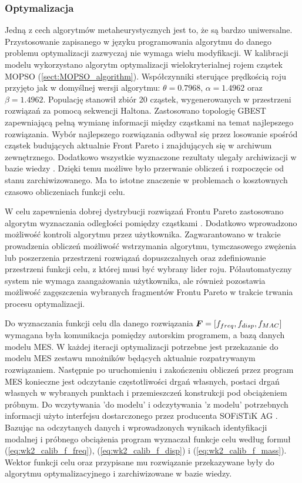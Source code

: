 \subsubsection{Optymalizacja}
Jedną z cech algorytmów metaheurystycznych jest to, że są bardzo uniwersalne. Przystosowanie zapisanego w języku programowania algorytmu do danego problemu optymalizacji zazwyczaj nie wymaga wielu modyfikacji. W kalibracji modelu wykorzystano algorytm optymalizacji wielokryterialnej rojem cząstek MOPSO (\ref{sect:MOPSO_algorithm}). Współczynniki sterujące prędkością roju przyjęto jak w domyślnej wersji algorytmu: $\theta=0.7968$, $\alpha=1.4962$ oraz $\beta=1.4962$. Populację stanowił zbiór 20 cząstek, wygenerowanych w przestrzeni rozwiązań za pomocą sekwencji Haltona. Zastosowano topologię GBEST zapewniającą pełną wymianę informacji między cząstkami na temat najlepszego rozwiązania. Wybór najlepszego rozwiązania odbywał się przez losowanie spośród cząstek budujących aktualnie Front Pareto i znajdujących się w archiwum zewnętrznego. Dodatkowo wszystkie wyznaczone rezultaty ulegały archiwizacji w bazie wiedzy . Dzięki temu możliwe było przerwanie obliczeń i rozpoczęcie od stanu zarchiwizowanego. Ma to istotne znaczenie w problemach o kosztownych czasowo obliczeniach funkcji celu. 

W celu zapewnienia dobrej dystrybucji rozwiązań Frontu Pareto zastosowano algorytm wyznaczania odległości pomiędzy cząstkami \parencite{Deb2002}. Dodatkowo wprowadzono możliwość kontroli algorytmu przez użytkownika. Zagwarantowano w trakcie prowadzenia obliczeń możliwość wstrzymania algorytmu, tymczasowego zwężenia lub poszerzenia przestrzeni rozwiązań dopuszczalnych oraz zdefiniowanie przestrzeni funkcji celu, z której musi być wybrany lider roju. Półautomatyczny system nie wymaga zaangażowania użytkownika, ale również pozostawia możliwość zagęszczenia wybranych fragmentów Frontu Pareto w trakcie trwania procesu optymalizacji.

Do wyznaczania funkcji celu dla danego rozwiązania $\bm{F}=[f_{freq},f_{disp},f_{MAC}]$ wymagana była komunikacja pomiędzy autorskim programem, a bazą danych modelu MES. W każdej iteracji optymalizacji potrzebne jest przekazanie do modelu MES zestawu mnożników będących aktualnie rozpatrywanym rozwiązaniem. Następnie po uruchomieniu i zakończeniu obliczeń przez program MES konieczne jest odczytanie częstotliwości drgań własnych, postaci drgań własnych w wybranych punktach i przemieszczeń konstrukcji pod obciążeniem próbnym. Do wczytywania 'do modelu' i odczytywania 'z modelu' potrzebnych informacji użyto interfejsu dostarczonego przez producenta SOFiSTiK AG \parencite{SOFISTIK2018}. Bazując na odczytanych danych i wprowadzonych wynikach identyfikacji modalnej i próbnego obciążenia program wyznaczał funkcje celu według formuł (\ref{eq:wk2_calib_f_freq}), (\ref{eq:wk2_calib_f_disp}) i (\ref{eq:wk2_calib_f_mass}). Wektor funkcji celu oraz przypisane mu rozwiązanie przekazywane były do algorytmu optymalizacyjnego i zarchiwizowane w bazie wiedzy.

